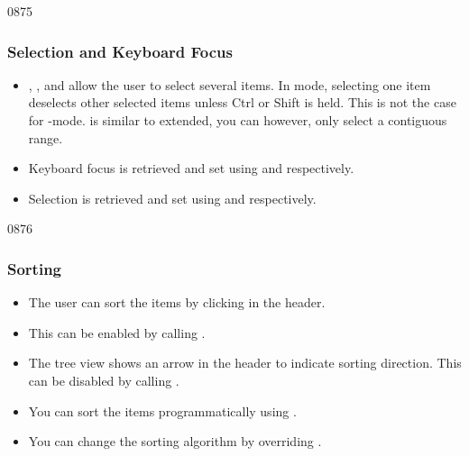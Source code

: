 \begin{slide}{0875}\frametitle{Selection and Keyboard Focus}
\begin{itemize}
\item {},
  , and  allow the user to select 
  several items. In  mode, selecting one item deselects
  other selected items unless Ctrl or Shift is held. This is not
  the case for
  -mode.  is similar to extended, you can however, only select a contiguous range.
\item Keyboard focus is retrieved and set using
   and 
  respectively.
\item Selection is retrieved and set using
   and
   respectively.
\end{itemize}
\end{slide}





\begin{slide}{0876}\frametitle{Sorting}
\begin{itemize}
\item The user can sort the items by clicking in the header.
\item This can be enabled by calling
  .
\item The tree view shows an arrow in the header to indicate sorting
  direction. This can be disabled by calling
  .
\item You can sort the items programmatically using
  .
\item You can change the sorting algorithm by overriding
  .
\end{itemize}
\end{slide}

